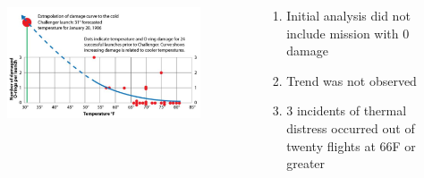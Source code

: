 \documentclass[aspectratio=1610,pdftex,dvipsnames,compress,xcolor={dvipsnames}]{beamer}
\begin{document}
\addtocounter{framenumber}{-1}
\begin{frame}{}
    \begin{columns}[c]

        \begin{column}{0.65\textwidth}
            \begin{figure}
                \centering
                \includegraphics[width=0.95\textwidth]{challenger.jpg}
            \end{figure}
        \end{column}

        \begin{column}{0.35\textwidth}
            \begin{enumerate}[series=outerlist,topsep=0pt,itemsep=15pt,leftmargin=*,label=(\arabic*)]
                \item[]Initial analysis did not include mission with 0 damage  
                \item[]Trend was not observed
                \item[]3 incidents of thermal distress occurred out of twenty flights at 66\degree F or greater
            \end{enumerate}
        \end{column}

    \end{columns}
\end{frame}
\end{document}
